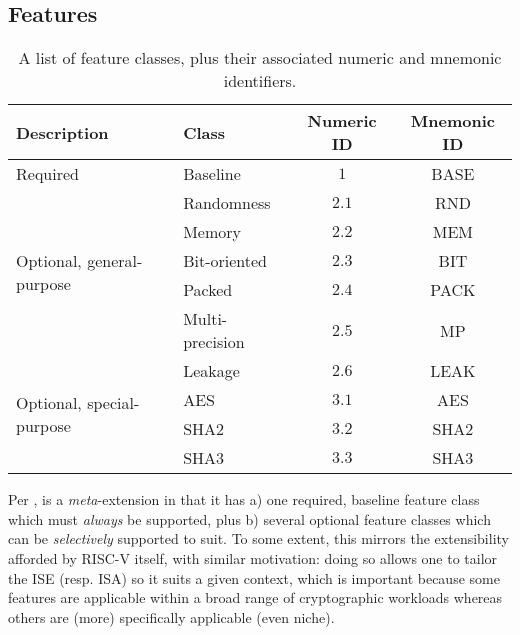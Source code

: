 
\subsection{Features}
\label{sec:bg:feature}

\begin{table}[t]
\begin{center}
\begin{tabular}{|l|l|cc|}
\hline
Description                                & Class           & Numeric ID & Mnemonic ID \\
\hline\hline
\multirow{1}{*}{Required                 } & Baseline        & $1$        & BASE        \\
\hline
\multirow{5}{*}{Optional, general-purpose} & Randomness      & $2.1$      & RND         \\
                                           & Memory          & $2.2$      & MEM         \\
                                           & Bit-oriented    & $2.3$      & BIT         \\
                                           & Packed          & $2.4$      & PACK        \\
                                           & Multi-precision & $2.5$      & MP          \\
                                           & Leakage         & $2.6$      & LEAK        \\
\hline
\multirow{2}{*}{Optional, special-purpose} & AES             & $3.1$      & AES         \\
                                           & SHA2            & $3.2$      & SHA2        \\
                                           & SHA3            & $3.3$      & SHA3        \\
\hline
\end{tabular}
\end{center}
\caption{A list of feature classes, plus their associated numeric and mnemonic identifiers.}
\label{tab:feature}
\end{table}

Per , \XCRYPTO is a {\em meta}-extension in that it has 
a) one     required, baseline feature class
   which must {\em always} be supported,
   plus
b) several optional           feature classes
   which can be {\em selectively} supported to suit.
To some extent, this mirrors the extensibility afforded by RISC-V itself, 
with similar motivation: doing so allows one to tailor the ISE (resp. ISA) 
so it suits a given context, which is important because some features are 
applicable within a broad range of cryptographic workloads whereas others 
are (more) specifically applicable (even niche).

